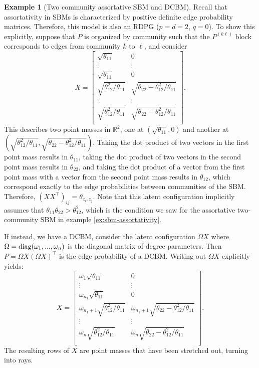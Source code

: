 \documentclass[
  12pt,
]{article}
\theoremstyle{definition}
\theoremstyle{definition}
\newtheorem{example}{Example}[section]
\theoremstyle{definition}
\theoremstyle{definition}
\theoremstyle{remark}
\begin{document}
\begin{example}[Two community assortative SBM and DCBM]
Recall that assortativity in SBMs is characterized by positive definite edge probability matrices. 
Therefore, this model is also an RDPG ($p = d = 2$, $q = 0$). 
To show this explicitly, suppose that $P$ is organized by community such that the $P^{(k \ell)}$ block corresponds to edges from community $k$ to $\ell$, and consider 
$$X = \begin{bmatrix}
\sqrt{\theta_{11}} & 0 \\ 
\vdots & \vdots \\ 
\sqrt{\theta_{11}} & 0 \\ 
\sqrt{\theta_{12}^2 / \theta_{11}} & \sqrt{\theta_{22} - \theta_{12}^2 / \theta_{11}} \\ 
\vdots & \vdots \\
\sqrt{\theta_{12}^2 / \theta_{11}} & \sqrt{\theta_{22} - \theta_{12}^2 / \theta_{11}} \\ 
\end{bmatrix}.$$
This describes two point masses in $\mathbb{R}^2$, one at $(\sqrt{\theta_{11}}, 0)$ and another at $(\sqrt{\theta_{12}^2 / \theta_{11}}, \sqrt{\theta_{22} - \theta_{12}^2 / \theta_{11}})$. 
Taking the dot product of two vectors in the first point mass results in $\theta_{11}$, taking the dot product of two vectors in the second point mass results in $\theta_{22}$, and taking the dot product of a vector from the first point mass with a vector from the second point mass results in $\theta_{12}$, which correspond exactly to the edge probabilities between communities of the SBM. 
Therefore, $(X X^\top)_{ij} = \theta_{z_i, z_j}$. 
Note that this latent configuration implicitly assumes that $\theta_{11} \theta_{22} > \theta_{12}^2$, which is the condition we saw for the assortative two-community SBM in example \ref{ex:sbm-assortativity}.

If instead, we have a DCBM, consider the latent configuration $\Omega X$ where $\Omega = \mathrm{diag}(\omega_1, ..., \omega_n)$ is the diagonal matrix of degree parameters. 
Then $P = \Omega X (\Omega X)^\top$ is the edge probability of a DCBM. 
Writing out $\Omega X$ explicitly yields:
$$X = \begin{bmatrix}
\omega_1 \sqrt{\theta_{11}} & 0 \\ 
\vdots & \vdots \\ 
\omega_{n_1} \sqrt{\theta_{11}} & 0 \\ 
\omega_{n_1 + 1} \sqrt{\theta_{12}^2 / \theta_{11}} & \omega_{n_1 + 1} \sqrt{\theta_{22} - \theta_{12}^2 / \theta_{11}} \\ 
\vdots & \vdots \\
\omega_n \sqrt{\theta_{12}^2 / \theta_{11}} & \omega_n \sqrt{\theta_{22} - \theta_{12}^2 / \theta_{11}} \\ 
\end{bmatrix}.$$
The resulting rows of $X$ are point masses that have been stretched out, turning into rays. 
\end{example}
\end{document}
